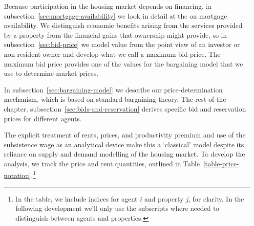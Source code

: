 Because participation in the housing market depends on financing, in subsection~\ref{sec:mortgage-availability} we look in detail at the on mortgage availability. We distinguish economic benefits arising from the services provided by a property from the financial gains that ownership might provide, so in subsection~\ref{sec:bid-price} we model value  from the point view of an investor or non-resident owner and develop what we call a maximum bid price.  The maximum bid price provides one of the values for the bargaining model that we use to determine market prices. 

In subsection~\ref{sec:bargaining-model} we describe our price-determination mechanism, which is based on standard bargaining theory.  The rest of the chapter, subsection~\ref{sec:bids-and-reservation} derives specific bid and reservation prices for different agents.

 The explicit treatment of rents, prices, and  productivity \gls{premium} and use of the \gls{subsistence wage} as an analytical device  make this a `\gls{classical}' model despite its reliance on supply and demand modelling of the housing market.  To develop the analysis, we track the price and rent quantities, outlined in Table~\ref{table-price-notation}.\footnote{In the table, we include indices for agent $i$ and property $j$, for clarity. In the following development we'll only use the subscripts where needed to distinguish between agents and properties.}



